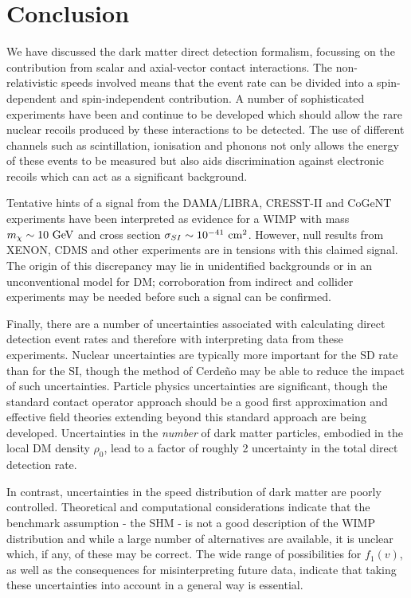 \section{Conclusion}

We have discussed the dark matter direct detection formalism, focussing on the contribution from scalar and axial-vector contact interactions. The non-relativistic speeds involved means that the event rate can be divided into a spin-dependent and spin-independent contribution. A number of sophisticated experiments have been and continue to be developed which should allow the rare nuclear recoils produced by these interactions to be detected. The use of different channels such as scintillation, ionisation and phonons not only allows the energy of these events to be measured but also aids discrimination against electronic recoils which can act as a significant background.

Tentative hints of a signal from the DAMA/LIBRA, CRESST-II and CoGeNT experiments have been interpreted as evidence for a WIMP with mass $m_\chi \sim 10 \textrm{ GeV}$ and cross section $\sigma_{SI} \sim 10^{-41} \textrm{ cm}^2$. However, null results from XENON, CDMS and other experiments are in tensions with this claimed signal. The origin of this discrepancy may lie in unidentified backgrounds or in an unconventional model for DM; corroboration from indirect and collider experiments may be needed before such a signal can be confirmed. 

Finally, there are a number of uncertainties associated with calculating direct detection event rates and therefore with interpreting data from these experiments. Nuclear uncertainties are typically more important for the SD rate than for the SI, though the method of Cerde\~{n}o \etal may be able to reduce the impact of such uncertainties. Particle physics uncertainties are significant, though the standard contact operator approach should be a good first approximation and effective field theories extending beyond this standard approach are being developed. Uncertainties in the \textit{number} of dark matter particles, embodied in the local DM density $\rho_0$, lead to a factor of roughly 2 uncertainty in the total direct detection rate. 

In contrast, uncertainties in the speed distribution of dark matter are poorly controlled. Theoretical and computational considerations indicate that the benchmark assumption - the SHM - is not a good description of the WIMP distribution and while a large number of alternatives are available, it is unclear which, if any, of these may be correct. The wide range of possibilities for $f_1(v)$, as well as the consequences for misinterpreting future data, indicate that taking these uncertainties into account in a general way is essential.


